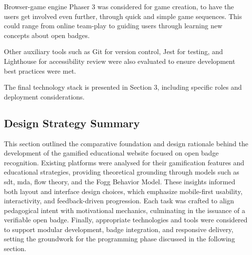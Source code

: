 Browser-game engine Phaser 3 was considered for game creation, to have the users get involved even further, through quick and simple game sequences. 
This could range from online team-play to guiding users through learning new concepts about open badges.

Other auxiliary tools such as Git for version control, Jest for testing, and Lighthouse for accessibility review were also evaluated to ensure development best practices were met.

The final technology stack is presented in Section 3, including specific roles and deployment considerations.

\subsection{Design Strategy Summary}
This section outlined the comparative foundation and design rationale behind the development of the gamified educational website focused on open badge recognition. 
Existing platforms were analysed for their gamification features and educational strategies, providing theoretical grounding through models such as \acrshort{sdt}, \acrshort{mda}, flow theory, and the Fogg Behavior Model. 
These insights informed both layout and interface design choices, which emphasize mobile-first usability, interactivity, and feedback-driven progression. 
Each task was crafted to align pedagogical intent with motivational mechanics, culminating in the issuance of a verifiable open badge. Finally, appropriate technologies and tools were considered to support modular development, badge integration, and responsive delivery, setting the groundwork for the programming phase discussed in the following section.